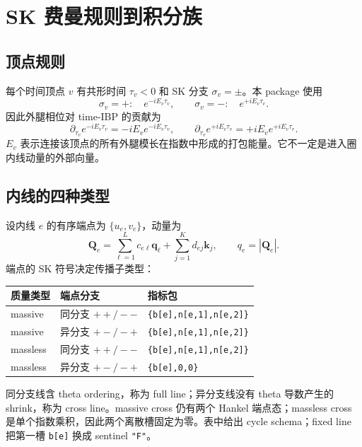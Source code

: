 ﻿\documentclass[a4paper,11pt]{article}
\begin{document}
\section{SK 费曼规则到积分族}

\subsection{顶点规则}

每个时间顶点 $v$ 有共形时间 $\tau_v<0$ 和 SK 分支 $\sigma_v=\pm$。本 package 使用
\begin{equation}
  \sigma_v=+:\quad e^{-iE_v\tau_v},
  \qquad
  \sigma_v=-:\quad e^{+iE_v\tau_v}.
\end{equation}
因此外腿相位对 time-IBP 的贡献为
\begin{equation}
  \partial_{\tau_v}e^{-iE_v\tau_v}=-iE_v e^{-iE_v\tau_v},
  \qquad
  \partial_{\tau_v}e^{+iE_v\tau_v}=+iE_v e^{+iE_v\tau_v}.
  \label{vertexPhaseRule}
\end{equation}
$E_v$ 表示连接该顶点的所有外腿模长在指数中形成的打包能量。它不一定是进入圈内线动量的外部向量。

\subsection{内线的四种类型}

设内线 $e$ 的有序端点为 $\{u_e,v_e\}$，动量为
\begin{equation}
 \bm Q_e=\sum_{\ell=1}^{L}c_{e\ell}\bm q_\ell
        +\sum_{j=1}^{K}d_{ej}\bm k_j,
 \qquad q_e=|\bm Q_e|.
\end{equation}
端点的 SK 符号决定传播子类型：
\begin{center}
\begin{tabular}{lll}
\toprule
质量类型 & 端点分支 & 指标包\\
\midrule
massive & 同分支 $++/--$ & \texttt{\{b[e],n[e,1],n[e,2]\}}\\
massive & 异分支 $+-/-+$ & \texttt{\{b[e],n[e,1],n[e,2]\}}\\
massless & 同分支 $++/--$ & \texttt{\{b[e],n[e,1],n[e,2]\}}\\
massless & 异分支 $+-/-+$ & \texttt{\{b[e],0,0\}}\\
\bottomrule
\end{tabular}
\end{center}
同分支线含 theta ordering，称为 full line；异分支线没有 theta 导数产生的 shrink，称为 cross line。massive cross 仍有两个 Hankel 端点态；massless cross 是单个指数乘积，因此两个离散槽固定为零。表中给出 cycle schema；fixed line 把第一槽 \texttt{b[e]} 换成 sentinel \texttt{"F"}。
\end{document}
